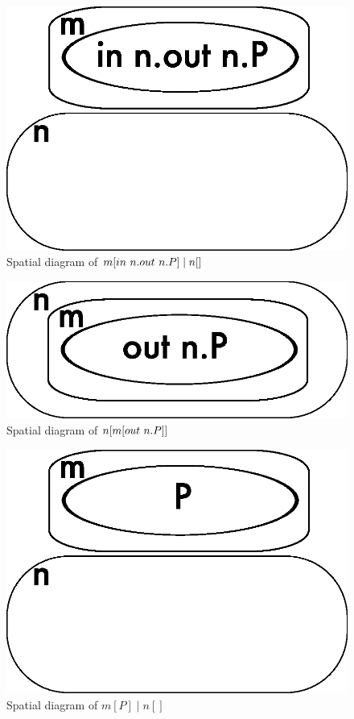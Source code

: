 \begin{figure}  
  \centering
  \includegraphics[scale=0.3]{ambient1}
  \caption{Spatial diagram of $m[in\ n.out\ n.P] \mid n[]$}
  \label{fig:ambient1}
\end{figure}

\begin{figure}  
  \centering
  \includegraphics[scale=0.3]{ambient2}
  \caption{Spatial diagram of $n[m[out\ n.P]]$}
  \label{fig:ambient2}
\end{figure}

\begin{figure}  
  \centering
  \includegraphics[scale=0.3]{ambient3}
  \caption{Spatial diagram of $m[P] \mid n[]$}
  \label{fig:ambient3}
\end{figure}

